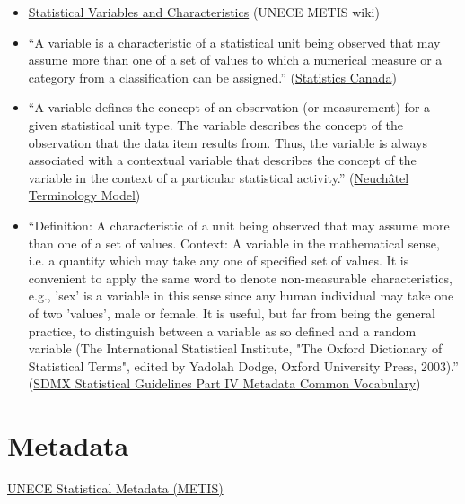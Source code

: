 \documentclass[reqno,12pt]{tufte-book}
\numberwithin{equation}{subsection}
\begin{document}
\begin{itemize}

\item \href{http://www1.unece.org/stat/platform/display/metis/Statistical+Variables+and+Characteristics}{Statistical
  Variables and Characteristics} (UNECE METIS wiki)

\item ``A variable is a characteristic of a statistical unit being observed that may assume more than one of a set of values to which a numerical measure or a category from a classification can be assigned.'' (\href{http://www.statcan.gc.ca/concepts/variable-eng.htm}{Statistics Canada})

\item ``A variable defines the concept of an observation (or measurement) for a given statistical unit type. The variable describes the concept of the observation that the data item results from. Thus, the variable is always associated with a contextual variable that describes the concept of the variable in the context of a particular statistical activity.'' (\href{http://www1.unece.org/stat/platform/download/attachments/14319930/Neuchatel+Model+V1.pdf?version=1}{Neuchâtel Terminology Model})

\item ``Definition: A characteristic of a unit being observed that may assume more than one of
a set of values.  Context: A variable in the mathematical sense, i.e. a quantity which may take any
one of specified set of values. It is convenient to apply the same word to
denote non-measurable characteristics, e.g., 'sex' is a variable in this sense
since any human individual may take one of two 'values', male or female. It
is useful, but far from being the general practice, to distinguish between a
variable as so defined and a random variable (The International Statistical
Institute, "The Oxford Dictionary of Statistical Terms", edited by Yadolah
Dodge, Oxford University Press, 2003).'' (\href{http://sdmx.org/wp-content/uploads/2009/01/04\_sdmx\_cog\_annex\_4\_mcv\_2009.pdf}{SDMX Statistical Guidelines Part IV Metadata Common Vocabulary})
\end{itemize}


\chapter{Metadata}

\href{http://www.unece.org/stats/metis.html}{UNECE Statistical Metadata (METIS)}
\end{document}

